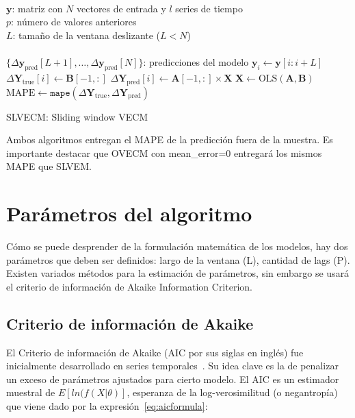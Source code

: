 \begin{algorithm}[ht]
\begin{algorithmic}[1]
\REQUIRE $\,$ \\
$\mathbf{y}$: matriz con $N$ vectores de entrada y $l$ series de tiempo\\
$p$: número de valores anteriores\\
$L$: tamaño de la ventana deslizante ($L<N$) \\
\ENSURE  $\,$ \\
$\{\Delta \mathbf{y}_{\text{pred}}[L+1],\dots,\Delta \mathbf{y}_{\text{pred}}[N]\}$: predicciones del modelo
    \STATE $\mathbf{y}_i \gets \mathbf{y}[i:i+L]$
        \STATE $\Delta \mathbf{Y}_{\text{true}}[i] \gets \mathbf{B}[-1,:]$
        \STATE $\Delta \mathbf{Y}_{\text{pred}}[i] \gets \mathbf{A}[-1,:] \times \mathbf{X}$
    \ENDIF
    \STATE $\mathbf{X} \gets \text{OLS} (\mathbf{A},\mathbf{B})$
\ENDFOR
    \STATE $\text{MAPE} \gets \texttt{mape}(\Delta \mathbf{Y}_{\text{true}}, \Delta
    \mathbf{Y}_{\text{pred}})$
\end{algorithmic}
\caption{SLVECM: Sliding window VECM}
\label{alg:SLVECM}
\end{algorithm}

Ambos algoritmos entregan el MAPE de la predicción fuera de la muestra. Es
importante destacar que OVECM con mean\_error=0 entregará los mismos MAPE que
SLVEM.

\section{Parámetros del algoritmo}
Cómo se puede desprender de la formulación matemática de los modelos, hay dos
parámetros que deben ser definidos: largo de la ventana (L), cantidad de lags
(P). Existen variados métodos para la estimación de parámetros, sin embargo se
usará el criterio de información de Akaike Information Criterion.

\subsection{Criterio de información de Akaike}
El Criterio de información de Akaike (AIC por sus siglas en inglés) fue
inicialmente desarrollado en series temporales~\cite{akaike1998information}. Su idea clave es
la de penalizar un exceso de parámetros ajustados para cierto modelo. El AIC es
un estimador muestral de $E[ln(f(X|\theta)]$, esperanza de la log-verosimilitud
(o negantropía) que viene dado por la expresión~\ref{eq:aicformula}:

